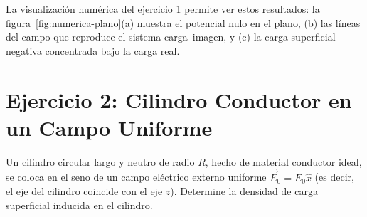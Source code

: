 \documentclass[11pt]{article}
\begin{document}
La visualización numérica del ejercicio 1 permite ver estos resultados:
la figura~\ref{fig:numerica-plano}(a) muestra el potencial nulo en el
plano, (b) las líneas del campo que reproduce el sistema carga--imagen,
y (c) la carga superficial negativa concentrada bajo la carga real.

\newpage

\section*{Ejercicio 2: Cilindro Conductor en un Campo Uniforme}

Un cilindro circular largo y neutro de radio $R$, hecho de material conductor ideal, se coloca en el seno de un campo eléctrico externo uniforme $\vec{E}_0 = E_0 \hat{x}$ (es decir, el eje del cilindro coincide con el eje $z$). Determine la densidad de carga superficial inducida en el cilindro.
\end{document}
